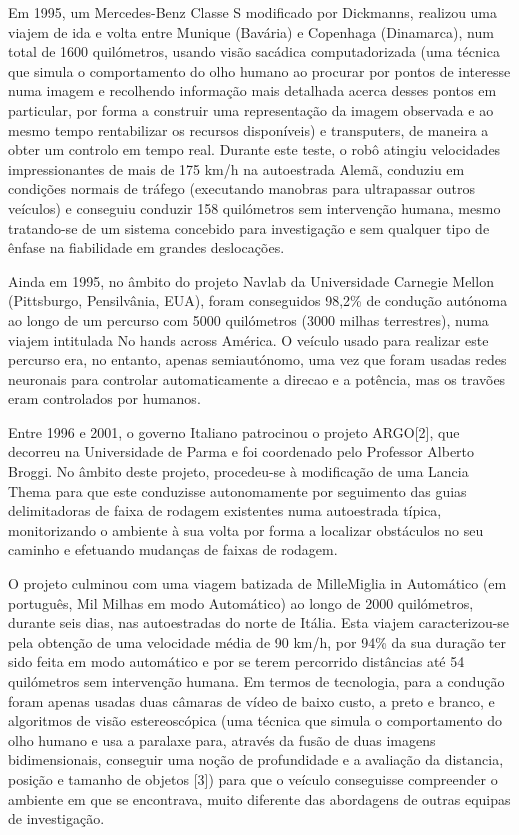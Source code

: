 \documentclass[a4paper,10pt]{texRel}
\begin{document}
Em 1995, um Mercedes-Benz Classe S modificado por Dickmanns, realizou uma viajem de ida e volta entre Munique (Bavária) e Copenhaga (Dinamarca), num total de 1600 quilómetros, usando visão sacádica computadorizada (uma técnica que simula o comportamento do olho humano ao procurar por pontos de interesse numa imagem e recolhendo informação mais detalhada acerca desses pontos em particular, por forma a construir uma representação da imagem observada e ao mesmo tempo rentabilizar os recursos disponíveis) e transputers, de maneira a obter um controlo em tempo real. Durante este teste, o robô atingiu velocidades impressionantes de mais de 175 km/h na autoestrada Alemã, conduziu em condições normais de tráfego (executando manobras para ultrapassar outros veículos) e conseguiu conduzir 158 quilómetros sem intervenção humana, mesmo tratando-se de um sistema concebido para investigação e sem qualquer tipo de ênfase na fiabilidade em grandes deslocações.

Ainda em 1995, no âmbito do projeto Navlab da Universidade Carnegie Mellon (Pittsburgo, Pensilvânia, EUA), foram conseguidos 98,2\% de condução autónoma ao longo de um percurso com 5000 quilómetros (3000 milhas terrestres), numa viajem intitulada No hands across América. 
O veículo usado para realizar este percurso era, no entanto, apenas semiautónomo, uma vez que foram usadas redes neuronais para controlar automaticamente a direcao e a potência, mas os travões eram controlados por humanos.

Entre 1996 e 2001, o governo Italiano patrocinou o projeto ARGO[2], que decorreu na Universidade de Parma e foi coordenado pelo Professor Alberto Broggi. No âmbito deste projeto, procedeu-se à modificação de uma Lancia Thema para que este conduzisse autonomamente por seguimento das guias delimitadoras de faixa de rodagem existentes numa autoestrada típica, monitorizando o ambiente à sua volta por forma a localizar obstáculos no seu caminho e efetuando mudanças de faixas de rodagem. 

O projeto culminou com uma viagem batizada de MilleMiglia in Automático (em português, Mil Milhas em modo Automático) ao longo de 2000 quilómetros, durante seis dias, nas autoestradas do norte de Itália. Esta viajem caracterizou-se pela obtenção de uma velocidade média de 90 km/h, por 94\% da sua duração ter sido feita em modo automático e por se terem percorrido distâncias até 54 quilómetros sem intervenção humana. Em termos de tecnologia, para a condução foram apenas usadas duas câmaras de vídeo de baixo custo, a preto e branco, e algoritmos de visão estereoscópica (uma técnica que simula o comportamento do olho humano e usa a paralaxe para, através da fusão de duas imagens bidimensionais, conseguir uma noção de profundidade e a avaliação da distancia, posição e tamanho de objetos [3]) para que o veículo conseguisse compreender o ambiente em que se encontrava, muito diferente das abordagens de outras equipas de investigação.
\end{document}
